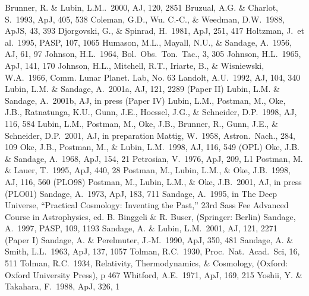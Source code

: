 \documentclass[preprint]{aastex}
\begin{document}
\begin{thebibliography}{}

\bibitem[]{}Brunner, R. \& Lubin, L.M..\ 2000, AJ, 120, 2851
\bibitem[]{}Bruzual, A.G. \& Charlot, S.\ 1993, ApJ, 405, 538
\bibitem[]{}Coleman, G.D., Wu. C.-C., \& Weedman, D.W.\ 1988, ApJS, 43, 393
\bibitem[]{}Djorgovski, G., \& Spinrad, H.\ 1981, ApJ, 251, 417
\bibitem[]{}Holtzman, J.\ et al.\ 1995, PASP, 107, 1065
\bibitem[]{}Humason, M.L., Mayall, N.U., \& Sandage, A.\ 1956, AJ, 61, 97
\bibitem[]{}Johnson, H.L.\ 1964, Bol.\ Obs.\ Ton.\ Tac., 3, 305  
\bibitem[]{}Johnson, H.L.\ 1965, ApJ, 141, 170
\bibitem[]{}Johnson, H.L., Mitchell, R.T., Iriarte, B., \& Wisniewski, W.A.\ 
1966, Comm. Lunar Planet. Lab, No. 63
\bibitem[]{}Landolt, A.U.\ 1992, AJ, 104, 340
\bibitem[]{}Lubin, L.M. \& Sandage, A.\ 2001a, AJ, 121, 2289 (Paper II)
\bibitem[]{}Lubin, L.M. \& Sandage, A.\ 2001b, AJ, in press (Paper IV)
\bibitem[]{}Lubin, L.M., Postman, M., Oke, J.B., Ratnatunga, K.U., Gunn, 
   J.E., Hoessel, J.G., \& Schneider, D.P.\ 1998, AJ, 116, 584
\bibitem[]{}Lubin, L.M., Postman, M., Oke, J.B., Brunner, R., Gunn, J.E., \& 
   Schneider, D.P.\ 2001, AJ, in preparation 
\bibitem[]{}Mattig, W.\ 1958, Astron.\ Nach., 284, 109
\bibitem[]{}Oke, J.B., Postman, M., \& Lubin, L.M.\ 1998, AJ, 116, 549 (OPL)
\bibitem[]{}Oke, J.B. \& Sandage, A.\ 1968, ApJ, 154, 21
\bibitem[]{}Petrosian, V.\ 1976, ApJ, 209, L1
\bibitem[]{}Postman, M. \& Lauer, T.\ 1995, ApJ, 440, 28
\bibitem[]{}Postman, M., Lubin, L.M., \& Oke, J.B.\ 1998, AJ, 116, 560 (PLO98)
\bibitem[]{}Postman, M., Lubin, L.M., \& Oke, J.B.\ 2001, AJ, in press (PLO01)
\bibitem[]{}Sandage, A.\ 1973, ApJ, 183, 711 
\bibitem[]{}Sandage, A.\ 1995, in The Deep Universe, ``Practical Cosmology: 
   Inventing the Past,'' 23rd Sass Fee Advanced Course in
   Astrophysics, ed. B. Binggeli \& R. Buser, (Springer: Berlin)
\bibitem[]{}Sandage, A.\ 1997, PASP, 109, 1193
\bibitem[]{}Sandage, A. \& Lubin, L.M.\ 2001, AJ, 121, 2271 (Paper I)
\bibitem[]{}Sandage, A. \& Perelmuter, J.-M.\ 1990, ApJ, 350, 481
\bibitem[]{}Sandage, A. \& Smith, L.L.\ 1963, ApJ, 137, 1057
\bibitem[]{}Tolman, R.C.\ 1930, Proc.\ Nat.\ Acad.\ Sci, 16, 511 
\bibitem[]{}Tolman, R.C.\ 1934, Relativity, Thermodynamics, \& Cosmology, 
   (Oxford: Oxford University Press), p 467
\bibitem[]{}Whitford, A.E.\ 1971, ApJ, 169, 215 
\bibitem[]{}Yoshii, Y. \& Takahara, F.\ 1988, ApJ, 326, 1

\end{thebibliography}

\newpage
\end{document}
